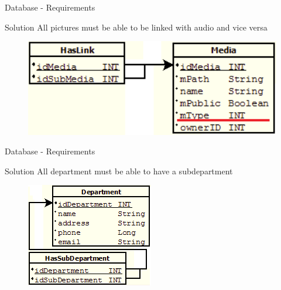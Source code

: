\begin{frame}{Database - Requirements}
    \begin{block}{Solution}
	All pictures must be able to be linked with audio and vice versa

\begin{figure}[htbp]
	\centering
		\includegraphics[width=1.00\textwidth]{Img/DatabaseMediaMediaRelation.png}
	\label{fig:DatabaseMediaMediaRelation}
\end{figure}

   \end{block}
\end{frame}

\begin{frame}{Database - Requirements}
    \begin{block}{Solution}
	All department must be able to have a subdepartment

\begin{figure}[htbp]
	\centering
		\includegraphics{Img/DatabaseDeptDeptRelation.png}
	\label{fig:DatabaseDeptDeptRelation}
\end{figure}

   \end{block}
\end{frame}

